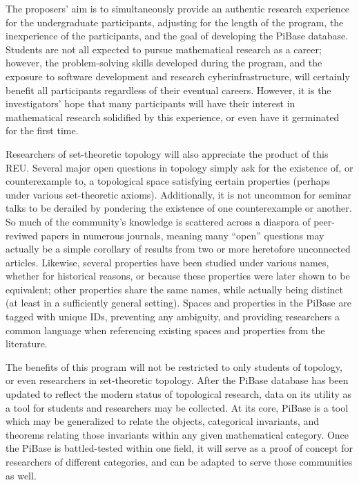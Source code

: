  The proposers' aim is to simultaneously provide an authentic research
  experience for the undergraduate participants, adjusting for the length of
  the program, the inexperience of the participants, and the goal of
  developing the PiBase database. Students are not all expected to pursue
  mathematical research as a career; however, the problem-solving skills
  developed during the program, and the exposure to software
  development and research cyberinfrastructure, will certainly benefit all
  participants regardless of their eventual careers. However, it is
  the investigators' hope that many participants will have their interest
  in mathematical research solidified by this experience, or even have it
  germinated for the first time.

  Researchers of set-theoretic topology will also appreciate the product
  of this REU. Several major open questions in topology simply ask for
  the existence of, or counterexample to, a topological space satisfying
  certain properties (perhaps under various set-theoretic axioms).
  Additionally, it is not uncommon for seminar talks to be derailed by
  pondering the existence of one counterexample or another. So much
  of the community's knowledge is scattered across
  a diaspora of peer-reviwed papers in numerous journals, meaning many
  ``open'' questions may actually be a simple corollary of results from
  two or more heretofore unconnected articles. Likewise, several properties
  have been
  studied under various names, whether for historical reasons, or because
  these properties were later shown to be equivalent; other properties share
  the same names, while actually being distinct (at least in a sufficiently
  general setting). Spaces and properties in the PiBase are tagged with
  unique IDs, preventing any ambiguity, and providing researchers a common
  language when referencing existing spaces and properties from the literature.

  The benefits of this program will not be restricted to only students of
  topology, or even researchers in set-theoretic topology. After the
  PiBase database has been updated to reflect the modern status of topological
  research, data on its utility as a tool for students and researchers may
  be collected. At its core, PiBase is a tool which may be generalized
  to relate the objects, categorical invariants, and theorems relating those
  invariants within any given mathematical category. Once the PiBase is
  battled-tested within one field, it will serve as a proof of concept for
  researchers of different categories, and can be adapted to serve those
  communities as well.

